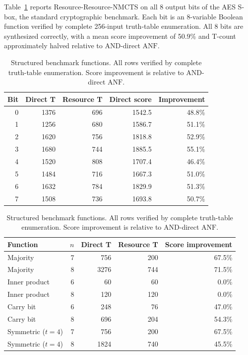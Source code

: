 \documentclass[11pt]{article}
\newcommand{\method}{Resource-NMCTS}
\newcommand{\anf}{\ensuremath{\mathrm{ANF}}}
\begin{document}
\begin{table}[H]
\centering
\small
Table~\ref{tab:aes-sbox} reports Resource-\method{} on all 8 output bits of
the AES S-box, the standard cryptographic benchmark.  Each bit is an 8-variable
Boolean function verified by complete 256-input truth-table enumeration.  All
8 bits are synthesized correctly, with a mean score improvement of 50.9\% and
T-count approximately halved relative to AND-direct \anf{}.

\begin{table}[H]
\centering\small
\caption{AES S-box output bits.  All verified by complete 256-input truth
tables.  Score improvement is relative to AND-direct \anf{}.}
\label{tab:aes-sbox}
\begin{tabular}{rrrrr}\toprule
Bit & Direct T & Resource T & Direct score & Improvement \\ \midrule
0 & 1376 & 696 & 1542.5 & 48.8\% \\
1 & 1256 & 680 & 1586.7 & 51.1\% \\
2 & 1620 & 756 & 1818.8 & 52.9\% \\
3 & 1680 & 744 & 1885.5 & 55.1\% \\
4 & 1520 & 808 & 1707.4 & 46.4\% \\
5 & 1484 & 716 & 1667.3 & 51.0\% \\
6 & 1632 & 784 & 1829.9 & 51.3\% \\
7 & 1508 & 736 & 1693.8 & 50.7\% \\ \bottomrule
\end{tabular}\end{table}

\caption{Structured benchmark functions.  All rows verified by complete
truth-table enumeration.  Score improvement is relative to AND-direct \anf{}.}
\label{tab:structured-benchmark}
\begin{tabular}{lrrrr}
\toprule
Function & $n$ & Direct T & Resource T & Score improvement \\
\midrule
Majority & 7 & 756 & 200 & 67.5\% \\
Majority & 8 & 3276 & 744 & 71.5\% \\
Inner product & 6 & 60 & 60 & 0.0\% \\
Inner product & 8 & 120 & 120 & 0.0\% \\
Carry bit & 6 & 248 & 76 & 47.0\% \\
Carry bit & 8 & 696 & 204 & 54.3\% \\
Symmetric ($t{=}4$) & 7 & 756 & 200 & 67.5\% \\
Symmetric ($t{=}4$) & 8 & 1824 & 740 & 45.5\% \\
\bottomrule
\end{tabular}
\end{table}
\end{document}
